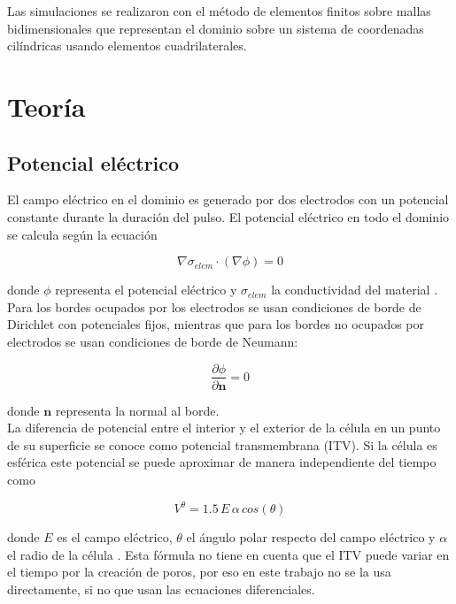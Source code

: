 \documentclass[11pt,a4paper,twoside]{tesis}
\begin{document}
Las simulaciones se realizaron con el método de elementos finitos sobre mallas bidimensionales que representan el dominio sobre un sistema de coordenadas cilíndricas usando elementos cuadrilaterales.

\chapter{Teoría}

\section{Potencial eléctrico}

El campo eléctrico en el dominio es generado por dos electrodos con un potencial constante durante la duración del pulso. El potencial eléctrico en todo el dominio se calcula según la ecuación 

\begin{equation} \label{eq:poisson}
	\nabla \sigma_{elem} \cdot (\nabla \phi) = 0 
\end{equation}

donde $\phi$ representa el potencial eléctrico y $\sigma_{elem}$ la conductividad del material \cite[p.~88]{fem-electro}.\\

Para los bordes ocupados por los electrodos se usan condiciones de borde de Dirichlet con potenciales fijos, mientras que para los bordes no ocupados por electrodos se usan condiciones de borde de Neumann:

\begin{equation}
	\frac{\partial \phi}{\partial \mathbf{n}} = 0
\end{equation}

donde $\mathbf{n}$ representa la normal al borde.\\

La diferencia de potencial entre el interior y el exterior de la célula en un punto de su superficie se conoce como potencial transmembrana (ITV). Si la célula es esférica este potencial se puede aproximar de manera independiente del tiempo como

\begin{equation} \label{eq:cos}
	V^{\theta} = 1.5\, E\, \alpha\, cos (\theta)
\end{equation}

donde $E$ es el campo eléctrico, $\theta$ el ángulo polar respecto del campo eléctrico y $\alpha$ el radio de la célula \cite{puchiar}. Esta fórmula no tiene en cuenta que el ITV puede variar en el tiempo por la creación de poros, por eso en este trabajo no se la usa directamente, si no que usan las ecuaciones diferenciales. 
\end{document}
